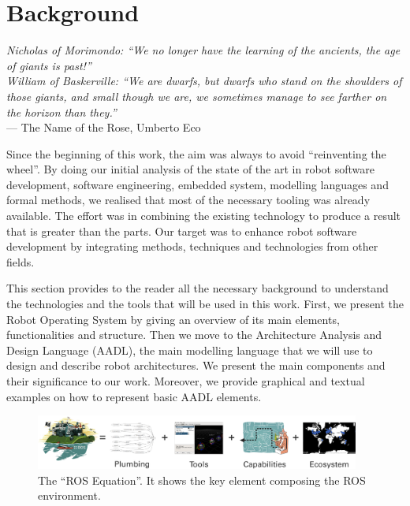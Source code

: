 \chapter[Background]{Background}\label{ch:Background}

\begin{flushright}{\slshape Nicholas of Morimondo: ``We no longer have the learning of the ancients, the age of giants is past!'' \\
William of Baskerville: ``We are dwarfs, but dwarfs who stand on the shoulders of those giants, and small though we are, we sometimes manage to see farther on the horizon than they.''} \\ \medskip
    ---  The Name of the Rose, Umberto Eco
\end{flushright}

Since the beginning of this work, the aim was always to avoid ``reinventing the wheel''. By doing our initial analysis of the state of the art in robot software development, software engineering, embedded system, modelling languages and formal methods, we realised that most of the necessary tooling was already available. The effort was in combining the existing technology to produce a result that is greater than the parts. Our target was to enhance robot software development by integrating methods, techniques and technologies from other fields.

This section provides to the reader all the necessary background to understand the technologies and the tools that will be used in this work. First, we present the Robot Operating System by giving an overview of its main elements, functionalities and structure. Then we move to the Architecture Analysis and Design Language (AADL), the main modelling language that we will use to design and describe robot architectures. We present the main components and their significance to our work. Moreover, we provide graphical and textual examples on how to represent basic AADL elements. 

\newpage

\minitoc
\newpage

\begin{figure}[t]
    \centering
    \includegraphics[width=0.95\textwidth]{gfx/ros/ros_equation}
    \caption[The ``ROS Equation''.]{The ``ROS Equation''. It shows the key element composing the ROS environment. }\label{fig:ros}
\end{figure}

